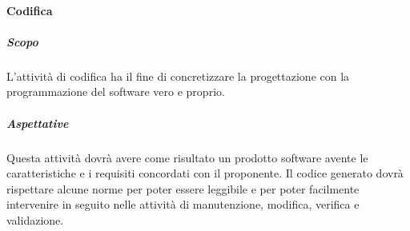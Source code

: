         \paragraph{Codifica}    \label{paragraph:Codifica}
            \subparagraph{Scopo}    \label{subparagraph:Codifica_Scopo}
            L’attività di codifica ha il fine di concretizzare la progettazione con la programmazione del software vero e proprio.

            \subparagraph{Aspettative}    \label{subparagraph:Codifica_Aspettative}
            Questa attività dovrà avere come risultato un prodotto software avente le caratteristiche e i requisiti concordati con il proponente. Il codice generato dovrà 
            rispettare alcune norme per poter essere leggibile e per poter facilmente intervenire in seguito nelle attività di manutenzione, modifica, verifica e validazione.

